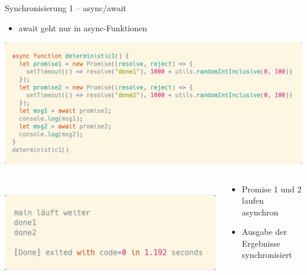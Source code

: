 \documentclass[t,handout]{beamer}
\begin{document}
\begin{frame}{Synchronisierung 1 -- async/await}
  \vspace*{-.3cm}
  \begin{itemize}
    \item await geht nur in async-Funktionen
  \end{itemize}
  \begin{center}
    \includegraphics[scale=.24]{fig/promises6.png}\\[-.2cm]
    \begin{columns}
      \begin{column}{0.48\textwidth}\\
        \includegraphics[scale=.21]{fig/promises7.png}
      \end{column}
      \begin{column}{0.48\textwidth}
        \begin{itemize}
          \item Promise 1 und 2 laufen asynchron
          \item Ausgabe der Ergebnisse synchronisiert
        \end{itemize}
      \end{column}
    \end{columns}
  \end{center}
\end{frame}
\end{document}
